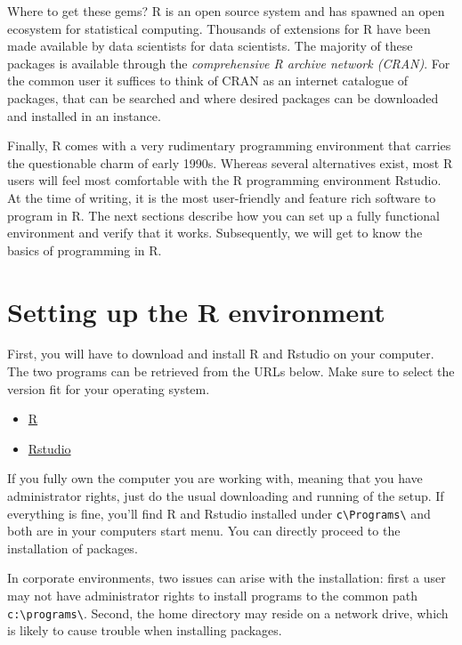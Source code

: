 \documentclass[]{svmono}
\providecommand{\tightlist}{%
  \setlength{\itemsep}{0pt}\setlength{\parskip}{0pt}}
\begin{document}
Where to get these gems? R is an open source system and has spawned an
open ecosystem for statistical computing. Thousands of extensions for R
have been made available by data scientists for data scientists. The
majority of these packages is available through the \emph{comprehensive
R archive network (CRAN)}. For the common user it suffices to think of
CRAN as an internet catalogue of packages, that can be searched and
where desired packages can be downloaded and installed in an instance.

Finally, R comes with a very rudimentary programming environment that
carries the questionable charm of early 1990s. Whereas several
alternatives exist, most R users will feel most comfortable with the R
programming environment Rstudio. At the time of writing, it is the most
user-friendly and feature rich software to program in R. The next
sections describe how you can set up a fully functional environment and
verify that it works. Subsequently, we will get to know the basics of
programming in R.

\section{Setting up the R
environment}\label{setting-up-the-r-environment}

First, you will have to download and install R and Rstudio on your
computer. The two programs can be retrieved from the URLs below. Make
sure to select the version fit for your operating system.

\begin{itemize}
\tightlist
\item
  \href{http://www.r-project.org}{R}
\item
  \href{http://www.rstudio.com}{Rstudio}
\end{itemize}

If you fully own the computer you are working with, meaning that you
have administrator rights, just do the usual downloading and running of
the setup. If everything is fine, you'll find R and Rstudio installed
under \texttt{c\textbackslash{}Programs\textbackslash{}} and both are in
your computers start menu. You can directly proceed to the installation
of packages.

In corporate environments, two issues can arise with the installation:
first a user may not have administrator rights to install programs to
the common path \texttt{c:\textbackslash{}programs\textbackslash{}}.
Second, the home directory may reside on a network drive, which is
likely to cause trouble when installing packages.
\end{document}
